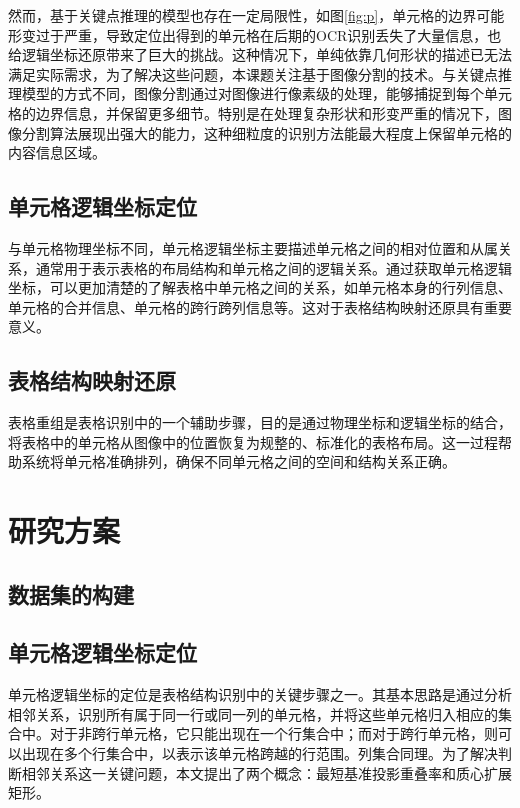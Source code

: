 \documentclass[number, UTF8,12pt, AutoFakeBold,fontset = founder]{ctexart}
\begin{document}
然而，基于关键点推理的模型也存在一定局限性，如图\ref{fig:p}，单元格的边界可能形变过于严重，导致定位出得到的单元格在后期的OCR识别丢失了大量信息，也给逻辑坐标还原带来了巨大的挑战。这种情况下，单纯依靠几何形状的描述已无法满足实际需求，为了解决这些问题，本课题关注基于图像分割的技术。与关键点推理模型的方式不同，图像分割通过对图像进行像素级的处理，能够捕捉到每个单元格的边界信息，并保留更多细节。特别是在处理复杂形状和形变严重的情况下，图像分割算法展现出强大的能力，这种细粒度的识别方法能最大程度上保留单元格的内容信息区域。

\subsection{单元格逻辑坐标定位}

与单元格物理坐标不同，单元格逻辑坐标主要描述单元格之间的相对位置和从属关系，通常用于表示表格的布局结构和单元格之间的逻辑关系。通过获取单元格逻辑坐标，可以更加清楚的了解表格中单元格之间的关系，如单元格本身的行列信息、单元格的合并信息、单元格的跨行跨列信息等。这对于表格结构映射还原具有重要意义。

\subsection{表格结构映射还原}

表格重组是表格识别中的一个辅助步骤，目的是通过物理坐标和逻辑坐标的结合，将表格中的单元格从图像中的位置恢复为规整的、标准化的表格布局。这一过程帮助系统将单元格准确排列，确保不同单元格之间的空间和结构关系正确。

\section{研究方案}
\subsection{数据集的构建}
\subsection{单元格逻辑坐标定位}

单元格逻辑坐标的定位是表格结构识别中的关键步骤之一。其基本思路是通过分析相邻关系，识别所有属于同一行或同一列的单元格，并将这些单元格归入相应的集合中。对于非跨行单元格，它只能出现在一个行集合中；而对于跨行单元格，则可以出现在多个行集合中，以表示该单元格跨越的行范围。列集合同理。为了解决判断相邻关系这一关键问题，本文提出了两个概念：最短基准投影重叠率和质心扩展矩形。
\end{document}
